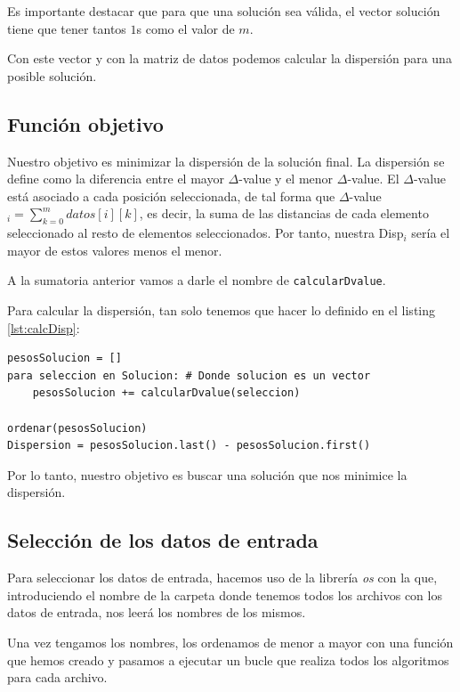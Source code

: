 Es importante destacar que para que una solución sea válida, el vector solución tiene que tener tantos $1$s como el valor de $m$.

Con este vector y con la matriz de datos podemos calcular la dispersión para una posible solución.


\subsection{Función objetivo}

Nuestro objetivo es minimizar la dispersión de la solución final.
La dispersión se define como la diferencia entre el mayor $\Delta$-value y el menor $\Delta$-value.
El $\Delta$-value está asociado a cada posición seleccionada, de tal forma que $\Delta$-value$_{i} = \sum_{k=0}^{m}datos[i][k]$, es decir, la suma de las distancias de cada elemento seleccionado al resto de elementos seleccionados. Por tanto, nuestra Disp$_i$ sería el mayor de estos valores menos el menor.

A la sumatoria anterior vamos a darle el nombre de \texttt{calcularDvalue}.

Para calcular la dispersión, tan solo tenemos que hacer lo definido en el listing \ref{lst:calcDisp}:

\begin{lstlisting}[frame=single, caption={Cálculo de la dispersión para una posible solución}, captionpos=b, label=lst:calcDisp]
pesosSolucion = []
para seleccion en Solucion: # Donde solucion es un vector
    pesosSolucion += calcularDvalue(seleccion)

ordenar(pesosSolucion)
Dispersion = pesosSolucion.last() - pesosSolucion.first()
\end{lstlisting}

Por lo tanto, nuestro objetivo es buscar una solución que nos minimice la dispersión.



\subsection{Selección de los datos de entrada}

Para seleccionar los datos de entrada, hacemos uso de la librería \textit{os} con la que, introduciendo el nombre de la carpeta donde tenemos todos los archivos con los datos de entrada, nos leerá los nombres de los mismos.

Una vez tengamos los nombres, los ordenamos de menor a mayor con una función que hemos creado y pasamos a ejecutar un bucle que realiza todos los algoritmos para cada archivo.

